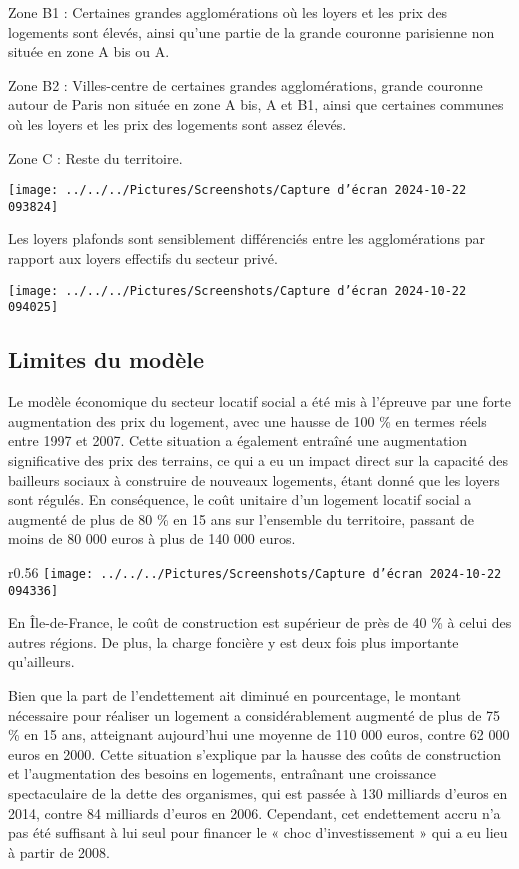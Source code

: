 \documentclass[a4paper, 12pt]{report}
\begin{document}
Zone B1 : Certaines grandes agglomérations où les loyers et les prix des logements sont élevés, ainsi qu'une partie de la grande couronne parisienne non située en zone A bis ou A.

Zone B2 : Villes-centre de certaines grandes agglomérations, grande couronne autour de Paris non située en zone A bis, A et B1, ainsi que certaines communes où les loyers et les prix des logements sont assez élevés.

Zone C : Reste du territoire.

\begin{center}
	\texttt{[image: ../../../Pictures/Screenshots/Capture d'écran 2024-10-22 093824]}
\end{center}

Les loyers plafonds sont sensiblement différenciés entre les agglomérations par rapport aux loyers effectifs du secteur privé.

\begin{center}
	\texttt{[image: ../../../Pictures/Screenshots/Capture d'écran 2024-10-22 094025]}
\end{center}


\subsection{Limites du modèle}

Le modèle économique du secteur locatif social a été mis à l'épreuve par une forte augmentation des prix du logement, avec une hausse de 100 \% en termes réels entre 1997 et 2007. Cette situation a également entraîné une augmentation significative des prix des terrains, ce qui a eu un impact direct sur la capacité des bailleurs sociaux à construire de nouveaux logements, étant donné que les loyers sont régulés. En conséquence, le coût unitaire d'un logement locatif social a augmenté de plus de 80 \% en 15 ans sur l'ensemble du territoire, passant de moins de 80 000 euros à plus de 140 000 euros.

\begin{wrapfigure}{r}{0.56\textwidth}
	\centering
\texttt{[image: ../../../Pictures/Screenshots/Capture d'écran 2024-10-22 094336]}
\end{wrapfigure}

En Île-de-France, le coût de construction est supérieur de près de 40 \% à celui des autres régions. De plus, la charge foncière y est deux fois plus importante qu'ailleurs.

Bien que la part de l’endettement ait diminué en pourcentage, le montant nécessaire pour réaliser un logement a considérablement augmenté de plus de 75 \% en 15 ans, atteignant aujourd'hui une moyenne de 110 000 euros, contre 62 000 euros en 2000. Cette situation s'explique par la hausse des coûts de construction et l'augmentation des besoins en logements, entraînant une croissance spectaculaire de la dette des organismes, qui est passée à 130 milliards d’euros en 2014, contre 84 milliards d’euros en 2006. Cependant, cet endettement accru n’a pas été suffisant à lui seul pour financer le « choc d’investissement » qui a eu lieu à partir de 2008.
\end{document}
